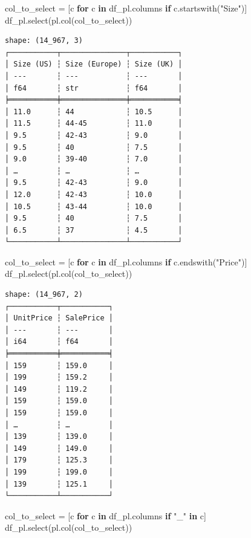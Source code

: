 \documentclass[
  letterpaper,
  DIV=11,
  numbers=noendperiod]{scrreprt}
\newenvironment{Shaded}{\begin{snugshade}}{\end{snugshade}}
\newcommand{\ControlFlowTok}[1]{\textcolor[rgb]{0.00,0.23,0.31}{\textbf{#1}}}
\newcommand{\KeywordTok}[1]{\textcolor[rgb]{0.00,0.23,0.31}{\textbf{#1}}}
\newcommand{\NormalTok}[1]{\textcolor[rgb]{0.00,0.23,0.31}{#1}}
\newcommand{\OperatorTok}[1]{\textcolor[rgb]{0.37,0.37,0.37}{#1}}
\newcommand{\StringTok}[1]{\textcolor[rgb]{0.13,0.47,0.30}{#1}}
\begin{document}
\begin{Shaded}
\begin{Highlighting}[]
\NormalTok{col\_to\_select }\OperatorTok{=}\NormalTok{ [c }\ControlFlowTok{for}\NormalTok{ c }\KeywordTok{in}\NormalTok{ df\_pl.columns }\ControlFlowTok{if}\NormalTok{ c.startswith(}\StringTok{"Size"}\NormalTok{)]}
\NormalTok{df\_pl.select(pl.col(col\_to\_select))}
\end{Highlighting}
\end{Shaded}

\begin{verbatim}
shape: (14_967, 3)
┌───────────┬───────────────┬───────────┐
│ Size (US) ┆ Size (Europe) ┆ Size (UK) │
│ ---       ┆ ---           ┆ ---       │
│ f64       ┆ str           ┆ f64       │
╞═══════════╪═══════════════╪═══════════╡
│ 11.0      ┆ 44            ┆ 10.5      │
│ 11.5      ┆ 44-45         ┆ 11.0      │
│ 9.5       ┆ 42-43         ┆ 9.0       │
│ 9.5       ┆ 40            ┆ 7.5       │
│ 9.0       ┆ 39-40         ┆ 7.0       │
│ …         ┆ …             ┆ …         │
│ 9.5       ┆ 42-43         ┆ 9.0       │
│ 12.0      ┆ 42-43         ┆ 10.0      │
│ 10.5      ┆ 43-44         ┆ 10.0      │
│ 9.5       ┆ 40            ┆ 7.5       │
│ 6.5       ┆ 37            ┆ 4.5       │
└───────────┴───────────────┴───────────┘
\end{verbatim}

\begin{Shaded}
\begin{Highlighting}[]
\NormalTok{col\_to\_select }\OperatorTok{=}\NormalTok{ [c }\ControlFlowTok{for}\NormalTok{ c }\KeywordTok{in}\NormalTok{ df\_pl.columns }\ControlFlowTok{if}\NormalTok{ c.endswith(}\StringTok{"Price"}\NormalTok{)]}
\NormalTok{df\_pl.select(pl.col(col\_to\_select))}
\end{Highlighting}
\end{Shaded}

\begin{verbatim}
shape: (14_967, 2)
┌───────────┬───────────┐
│ UnitPrice ┆ SalePrice │
│ ---       ┆ ---       │
│ i64       ┆ f64       │
╞═══════════╪═══════════╡
│ 159       ┆ 159.0     │
│ 199       ┆ 159.2     │
│ 149       ┆ 119.2     │
│ 159       ┆ 159.0     │
│ 159       ┆ 159.0     │
│ …         ┆ …         │
│ 139       ┆ 139.0     │
│ 149       ┆ 149.0     │
│ 179       ┆ 125.3     │
│ 199       ┆ 199.0     │
│ 139       ┆ 125.1     │
└───────────┴───────────┘
\end{verbatim}

\begin{Shaded}
\begin{Highlighting}[]
\NormalTok{col\_to\_select }\OperatorTok{=}\NormalTok{ [c }\ControlFlowTok{for}\NormalTok{ c }\KeywordTok{in}\NormalTok{ df\_pl.columns }\ControlFlowTok{if} \StringTok{"\_"} \KeywordTok{in}\NormalTok{ c]}
\NormalTok{df\_pl.select(pl.col(col\_to\_select))}
\end{Highlighting}
\end{Shaded}
\end{document}
